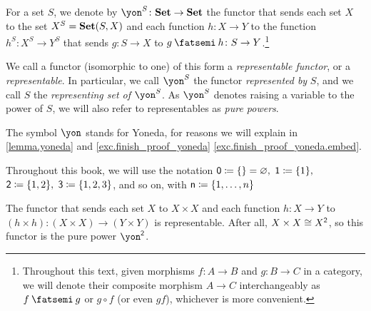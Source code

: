 \documentclass[Book-Poly]{subfiles}
\begin{document}
\begin{definition} \label{def.representable}
    For a set $S$, we denote by $\yon^S\colon\smset\to\smset$ the functor that sends each set $X$ to the set $X^S=\mathbf{Set}(S,X)$ and each function $h\colon X\to Y$ to the function $h^S\colon X^S\to Y^S$ that sends $g\colon S\to X$ to $g\then h\colon S\to Y$.\footnote{Throughout this text, given morphisms $f \colon A \to B$ and $g \colon B \to C$ in a category, we will denote their composite morphism $A \to C$ interchangeably as $f \then g$ or $g \circ f$ (or even $gf$), whichever is more convenient.}

    We call a functor (isomorphic to one) of this form a \emph{representable functor}, or a \emph{representable}.
    In particular, we call $\yon^S$ the functor \emph{represented by} $S$, and we call $S$ the \emph{representing set of $\yon^S$}.
    As $\yon^S$ denotes raising a variable to the power of $S$, we will also refer to representables as \emph{pure powers}.%
\end{definition}

The symbol $\yon$ stands for Yoneda, for reasons we will explain in \cref{lemma.yoneda} and \cref{exc.finish_proof_yoneda} \cref{exc.finish_proof_yoneda.embed}.

Throughout this book, we will use the notation $\textsf{0}\coloneqq\{\}=\varnothing,$ $\textsf{1}\coloneqq\{1\},$ $\textsf{2}\coloneqq\{1,2\},$ $\textsf{3}\coloneqq\{1,2,3\}$, and so on, with $\mathsf{n}\coloneqq\{1,\ldots,n\}$
\begin{example}
    The functor that sends each set $X$ to $X\times X$ and each function $h\colon X\to Y$ to $(h\times h)\colon (X\times X)\to(Y\times Y)$ is representable.
    After all, $X\times X \cong X^{\textsf{2}}$, so this functor is the pure power $\yon^\2$.
\end{example}
\end{document}
